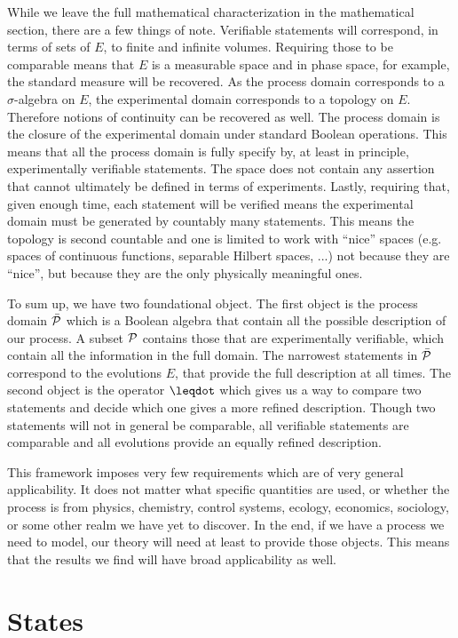 \documentclass[letterpaper]{article}
\begin{document}
While we leave the full mathematical characterization in the mathematical section, there are a few things of note. Verifiable statements will correspond, in terms of sets of $E$, to finite and infinite volumes. Requiring those to be comparable means that $E$ is a measurable space and in phase space, for example, the standard measure will be recovered. As the process domain corresponds to a $\sigma$-algebra on $E$, the experimental domain corresponds to a topology on $E$. Therefore notions of continuity can be recovered as well. The process domain is the closure of the experimental domain under standard Boolean operations. This means that all the process domain is fully specify by, at least in principle, experimentally verifiable statements. The space does not contain any assertion that cannot ultimately be defined in terms of experiments. Lastly, requiring that, given enough time, each statement will be verified means the experimental domain must be generated by countably many statements. This means the topology is second countable and one is limited to work with ``nice'' spaces (e.g. spaces of continuous functions, separable Hilbert spaces, ...) not because they are ``nice'', but because they are the only physically meaningful ones.

To sum up, we have two foundational object. The first object is the process domain $\tdomain[P]$ which is a Boolean algebra that contain all the possible description of our process. A subset $\edomain[P]$ contains those that are experimentally verifiable, which contain all the information in the full domain. The narrowest statements in $\tdomain[P]$ correspond to the evolutions $E$, that provide the full description at all times. The second object is the operator $\finer$ which gives us a way to compare two statements and decide which one gives a more refined description. Though two statements will not in general be comparable, all verifiable statements are comparable and all evolutions provide an equally refined description.

This framework imposes very few requirements which are of very general applicability. It does not matter what specific quantities are used, or whether the process is from physics, chemistry, control systems, ecology, economics, sociology, or some other realm we have yet to discover. In the end, if we have a process we need to model, our theory will need at least to provide those objects. This means that the results we find will have broad applicability as well.

\section{States}
\end{document}
